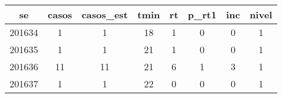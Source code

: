 \begin{tabular}{c|ccccccc}
  \hline
se & casos & casos\_est & tmin & rt & p\_rt1 & inc & nivel \\ 
  \hline
201634 & 1 & 1 & 18 & 1 & 0 & 0 & 1 \\ 
  201635 & 1 & 1 & 21 & 1 & 0 & 0 & 1 \\ 
  201636 & 11 & 11 & 21 & 6 & 1 & 3 & 1 \\ 
  201637 & 1 & 1 & 22 & 0 & 0 & 0 & 1 \\ 
   \hline
\end{tabular}
